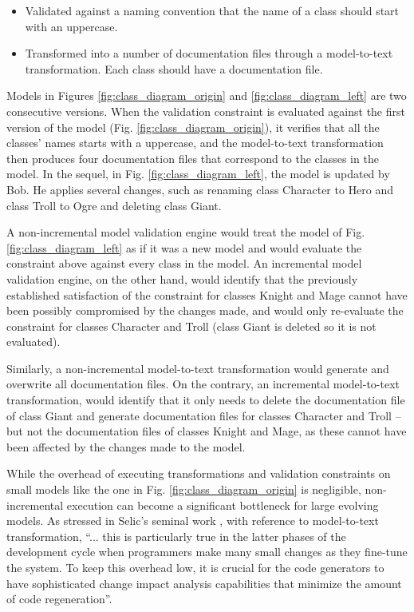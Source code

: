 \begin{itemize}
    \item Validated against a naming convention that the name of a class should start with an uppercase.
    \item Transformed into a number of documentation files through a model-to-text transformation. Each class should have a documentation file.
\end{itemize}

Models in Figures \ref{fig:class_diagram_origin} and \ref{fig:class_diagram_left} are two consecutive versions. When the validation constraint is evaluated against the first version of the model (Fig. \ref{fig:class_diagram_origin}), it verifies that all the classes' names starts with a uppercase, and the model-to-text transformation then produces four documentation files that correspond to the classes in the model. In the sequel, in Fig. \ref{fig:class_diagram_left}, the model is updated by Bob. He applies several changes, such as renaming class \textsf{Character} to \textsf{Hero} and class \textsf{Troll} to \textsf{Ogre} and deleting class \textsf{Giant}.

A non-incremental model validation engine would treat the model of 
Fig. \ref{fig:class_diagram_left} as if it was a new model and would evaluate 
the constraint above against every class in the model. 
An incremental model validation engine, on the other hand, would identify 
that the previously established satisfaction of the constraint for classes 
\textsf{Knight} and \textsf{Mage} cannot have been possibly compromised by the changes made, and would only re-evaluate the constraint for classes \textsf{Character} and \textsf{Troll} (class \textsf{Giant} is deleted so it is not evaluated). 

Similarly, a non-incremental model-to-text transformation would generate 
and overwrite all documentation files. On the contrary, an 
incremental model-to-text transformation, would identify that it only needs to delete the documentation file of class \textsf{Giant} and generate documentation files for classes \textsf{Character} and \textsf{Troll} -- but not the documentation files of classes \textsf{Knight} and \textsf{Mage}, as these cannot have been affected by the changes made to the model.

While the overhead of executing transformations and validation constraints 
on small models like the one in Fig. \ref{fig:class_diagram_origin} is negligible, non-incremental execution can become a significant bottleneck for large evolving models. As stressed in Selic's seminal work \cite{selic2003pragmatics}, with reference to model-to-text transformation, ``... \textsf{this is particularly true in the latter phases of the development cycle when programmers make many small changes as they fine-tune the system. To keep this overhead low, it is crucial for the code generators to have sophisticated change impact analysis capabilities that minimize the amount of code regeneration}''.


